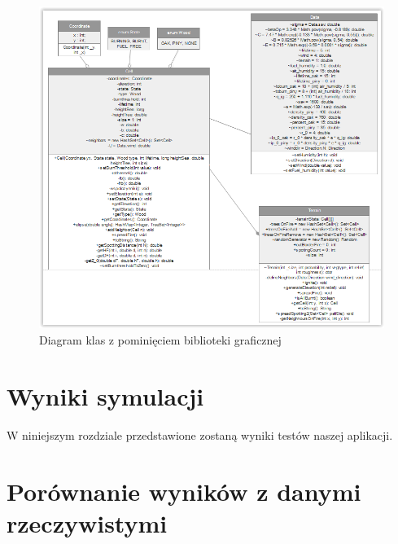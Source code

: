 \documentclass[a4paper, 11pt]{article}
\begin{document}
	\begin{figure}[H]
		\centerline{\includegraphics[scale=0.9]{classDiagram}}
		\raggedright{	\caption{Diagram klas z pominięciem biblioteki graficznej}}
	\end{figure}
	
	\section{Wyniki symulacji}
	\indent
	W niniejszym rozdziale przedstawione zostaną wyniki testów naszej aplikacji.
	\section*{Porównanie wyników z danymi rzeczywistymi}
	\indent
	
\end{document}
